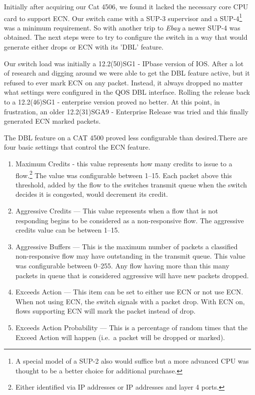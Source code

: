 \documentclass[12pt]{article}
\begin{document}
Initially after acquiring our Cat 4506, we found it lacked the necessary core CPU card
to support ECN. Our switch came with a SUP-3 supervisor and a SUP-4\footnote{A special model
of a SUP-2 also would suffice but a more advanced CPU was thought to be a better
choice for additional purchase.}  was a minimum
requirement. So with another trip to \emph{Ebay} a newer SUP-4 was obtained. The
next steps were to try to configure the switch in a way that would generate either drops
or ECN with its 'DBL' feature.

Our switch load was initially a 12.2(50)SG1 - IPbase version of IOS. After
a lot of research and digging around we were able to get the DBL feature active, but it
refused to ever mark ECN on any packet. Instead, it always dropped no matter what
settings were configured in the QOS DBL interface. Rolling the release back to a 12.2(46)SG1 - enterprise version 
proved no better. At this point, in frustration, an older 12.2(31)SGA9 - Enterprise Release was tried and this finally
generated ECN marked packets. 

The DBL feature on a CAT 4500 proved less configurable than desired.There are four
basic settings that control the ECN feature. 

\begin{enumerate}

\item Maximum Credits - this value represents how many credits to issue to a
flow.\footnote{Either identified via IP addresses or IP addresses and layer 4 ports.}
The value was configurable between 1--15. Each
packet above this threshold, added by the flow to the switches transmit queue when the
switch decides it is congested, would decrement its credit.

\item Aggressive Credits --- This value represents when a flow that is not responding begins
to be considered as a non-responsive flow. The aggressive credits value
can be between 1--15.

\item Aggressive Buffers --- This is the maximum number of packets a classified non-responsive
flow may have outstanding in the transmit queue. This value was configurable  between 0--255.
Any flow having more than this many packets in queue that is considered aggressive will have
new packets dropped.

\item Exceeds Action --- This item can be set to either use ECN or not use ECN. When not
using ECN, the switch signals with a packet drop. With ECN on, flows supporting
ECN will mark the packet instead of drop.

\item Exceeds Action Probability --- This is a percentage of random times that the Exceed
Action will happen (i.e.~a packet will be dropped or marked).

\end{enumerate}
\end{document}
